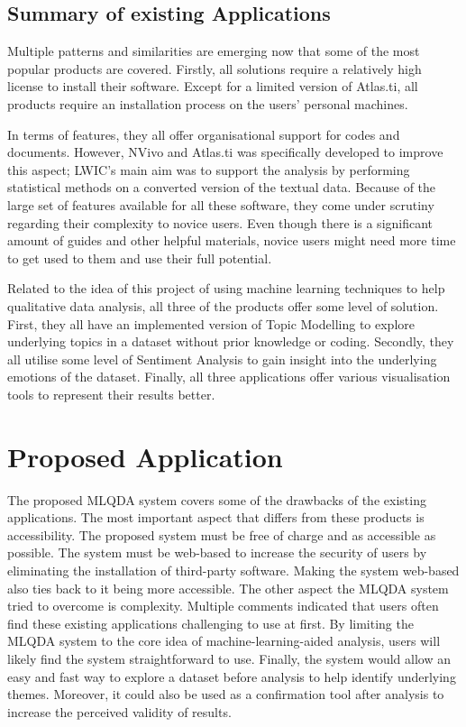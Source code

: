 \documentclass{l4proj}
\begin{document}
\subsection{Summary of existing Applications}
Multiple patterns and similarities are emerging now that some of the most popular products are covered. Firstly, all solutions require a relatively high license to install their software. Except for a limited version of Atlas.ti, all products require an installation process on the users' personal machines.

In terms of features, they all offer organisational support for codes and documents. However, NVivo and Atlas.ti was specifically developed to improve this aspect; LWIC's main aim was to support the analysis by performing statistical methods on a converted version of the textual data. Because of the large set of features available for all these software, they come under scrutiny regarding their complexity to novice users. Even though there is a significant amount of guides and other helpful materials, novice users might need more time to get used to them and use their full potential.

Related to the idea of this project of using machine learning techniques to help qualitative data analysis, all three of the products offer some level of solution. First, they all have an implemented version of Topic Modelling to explore underlying topics in a dataset without prior knowledge or coding. Secondly, they all utilise some level of Sentiment Analysis to gain insight into the underlying emotions of the dataset. Finally, all three applications offer various visualisation tools to represent their results better.

\section{Proposed Application}
The proposed MLQDA system covers some of the drawbacks of the existing applications. The most important aspect that differs from these products is accessibility. The proposed system must be free of charge and as accessible as possible. The system must be web-based to increase the security of users by eliminating the installation of third-party software. Making the system web-based also ties back to it being more accessible. The other aspect the MLQDA system tried to overcome is complexity. Multiple comments indicated that users often find these existing applications challenging to use at first. By limiting the MLQDA system to the core idea of machine-learning-aided analysis, users will likely find the system straightforward to use. Finally, the system would allow an easy and fast way to explore a dataset before analysis to help identify underlying themes. Moreover, it could also be used as a confirmation tool after analysis to increase the perceived validity of results. 
\end{document}
